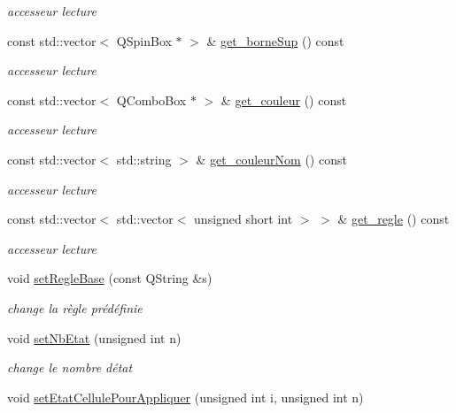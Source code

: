 \begin{DoxyCompactItemize}
\begin{DoxyCompactList}\small\item\em accesseur lecture \end{DoxyCompactList}\item 
const std\+::vector$<$ Q\+Spin\+Box $\ast$ $>$ \& \hyperlink{class_regle2_d_ada123ada77ca4c432fb6793466a2f653}{get\+\_\+borne\+Sup} () const 
\begin{DoxyCompactList}\small\item\em accesseur lecture \end{DoxyCompactList}\item 
const std\+::vector$<$ Q\+Combo\+Box $\ast$ $>$ \& \hyperlink{class_regle2_d_a9da84d09974a0cf60d59bf84e4bfff0a}{get\+\_\+couleur} () const 
\begin{DoxyCompactList}\small\item\em accesseur lecture \end{DoxyCompactList}\item 
const std\+::vector$<$ std\+::string $>$ \& \hyperlink{class_regle2_d_a80dc816d0ce1dc33cba264c41e1a6f8e}{get\+\_\+couleur\+Nom} () const 
\begin{DoxyCompactList}\small\item\em accesseur lecture \end{DoxyCompactList}\item 
const std\+::vector$<$ std\+::vector$<$ unsigned short int $>$ $>$ \& \hyperlink{class_regle2_d_a6165adcd23f35308667da783c210c911}{get\+\_\+regle} () const 
\begin{DoxyCompactList}\small\item\em accesseur lecture \end{DoxyCompactList}\item 
void \hyperlink{class_regle2_d_a93a3404a450462b60a01dcf102e65eee}{set\+Regle\+Base} (const Q\+String \&s)
\begin{DoxyCompactList}\small\item\em change la règle prédéfinie \end{DoxyCompactList}\item 
void \hyperlink{class_regle2_d_aa287cec81b0b71d3f87fea5357bec46b}{set\+Nb\+Etat} (unsigned int n)
\begin{DoxyCompactList}\small\item\em change le nombre d\textquotesingle{}état \end{DoxyCompactList}\item 
void \hyperlink{class_regle2_d_adfdc1e1d68906882c9e96b900dc49086}{set\+Etat\+Cellule\+Pour\+Appliquer} (unsigned int i, unsigned int n)

\end{DoxyCompactItemize}
